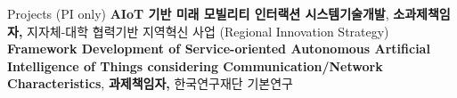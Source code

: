 \begin{rubric}{Projects (PI only)}
%
%
\entry*[2021 -- 2024] \textbf{AIoT 기반 미래 모빌리티 인터랙션 시스템기술개발}, \newline \textbf{소과제책임자,} 지자체-대학 협력기반 지역혁신 사업 (Regional Innovation Strategy)
%
\entry*[2022 -- 2023] \textbf{Framework Development of Service-oriented Autonomous Artificial Intelligence of Things considering Communication/Network Characteristics}, \newline \textbf{과제책임자,} 한국연구재단 기본연구
%


\end{rubric}
